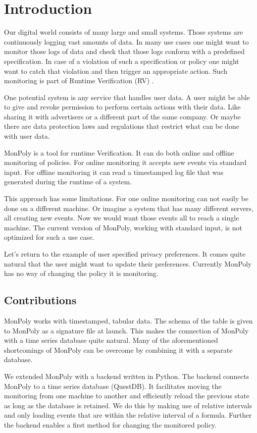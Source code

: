 \section{Introduction}

Our digital world consists of many large and small systems.
Those systems are continuously logging vast amounts of data.
In many use cases one might want to monitor those logs of data and check that those logs conform with a predefined specification.
In case of a violation of such a specification or policy one might want to catch that violation and then trigger an appropriate action.
Such monitoring is part of Runtime Verification (RV) \cite{Bartocci2018}.

One potential system is any service that handles user data.
A user might be able to give and revoke permission to perform certain actions with their data.
Like sharing it with advertisers or a different part of the same company.
Or maybe there are data protection laws and regulations that restrict what can be done with user data.

MonPoly \cite{Basin2017} is a tool for runtime Verification.
It can do both online and offline monitoring of policies.
For online monitoring it accepts new events via standard input.
For offline monitoring it can read a timestamped log file that was generated during the runtime of a system.

This approach has some limitations. For one online monitoring can not easily be done on a different machine.
Or imagine a system that has many different servers, all creating new events.
Now we would want those events all to reach a single machine.
The current version of MonPoly, working with standard input, is not optimized for such a use case.

Let's return to the example of user specified privacy preferences.
It comes quite natural that the user might want to update their preferences.
Currently MonPoly has no way of changing the policy it is monitoring.

\subsection{Contributions}
MonPoly works with timestamped, tabular data.
The schema of the table is given to MonPoly as a signature file at launch.
This makes the connection of MonPoly with a time series database quite natural.
Many of the aforementioned shortcomings of MonPoly can be overcome by combining it with a separate database.

We extended MonPoly with a backend written in Python.
The backend connects MonPoly to a time series database (QuestDB).
It facilitates moving the monitoring from one machine to another and efficiently reload the previous state as long as the database is retained. 
We do this by making use of relative intervals and only loading events that are within the relative interval of a formula.
Further the backend enables a first method for changing the monitored policy.




